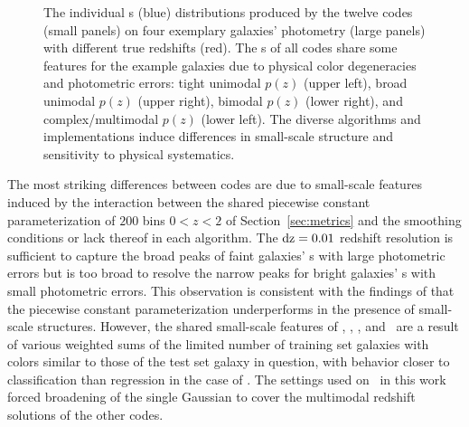 \begin{figure}
\caption{The individual \pzpdf s (blue) distributions produced by the twelve codes (small panels) on four exemplary galaxies' photometry (large panels) with different true redshifts (red).
The \pzpdf s of all codes share some features for the example galaxies due to physical color degeneracies and photometric errors: tight unimodal $p(z)$ (upper left), broad unimodal $p(z)$ (upper right), bimodal $p(z)$ (lower right), and complex/multimodal $p(z)$ (lower left).
The diverse algorithms and implementations induce differences in small-scale structure and sensitivity to physical systematics.}
\label{fig:pz_examples}
\end{figure}

The most striking differences between codes are due to small-scale features induced by the interaction between the shared piecewise constant parameterization of $200$ bins $0 < z < 2$ of Section~\ref{sec:metrics} and the smoothing conditions or lack thereof in each algorithm.
The $\rm{d}z = 0.01$ redshift resolution is sufficient to capture the broad peaks of faint galaxies' \pzpdf s with large photometric errors but is too broad to resolve the narrow peaks for bright galaxies' \pzpdf s with small photometric errors.
This observation is consistent with the findings of \citet[]{Malz:qp} that the piecewise constant parameterization underperforms in the presence of small-scale structures.
However, the shared small-scale features of \annz, \metaphor, \cmnn, and \skynet\ are a result of various weighted sums of the limited number of training set galaxies with colors similar to those of the test set galaxy in question, with behavior closer to classification than regression in the case of \annz.
The settings used on \gpz\ in this work forced broadening of the single Gaussian to cover the multimodal redshift solutions of the other codes.
